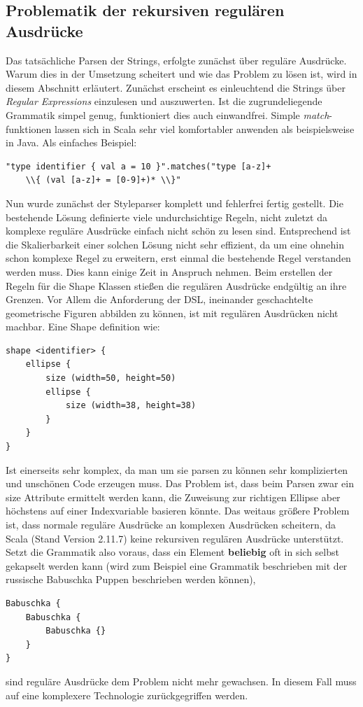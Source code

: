 \subsection{Problematik der rekursiven regulären Ausdrücke}
Das tatsächliche Parsen der Strings, erfolgte zunächst über reguläre Ausdrücke. Warum dies in der Umsetzung scheitert und wie das Problem zu lösen ist, wird in diesem Abschnitt erläutert. Zunächst erscheint es einleuchtend die Strings über \textit{Regular Expressions} einzulesen und auszuwerten. Ist die zugrundeliegende Grammatik simpel genug, funktioniert dies auch einwandfrei. Simple \textit{match}-funktionen lassen sich in Scala sehr viel komfortabler anwenden als beispielsweise in Java. Als einfaches Beispiel:
\begin{lstlisting}[style=scala]
"type identifier { val a = 10 }".matches("type [a-z]+
    \\{ (val [a-z]+ = [0-9]+)* \\}"
\end{lstlisting}Nun wurde zunächst der Styleparser komplett und fehlerfrei fertig gestellt. Die bestehende Lösung definierte viele undurchsichtige Regeln, nicht zuletzt da komplexe reguläre Ausdrücke einfach nicht schön zu lesen sind. Entsprechend ist die Skalierbarkeit einer solchen Lösung nicht sehr effizient, da um eine ohnehin schon komplexe Regel zu erweitern, erst einmal die bestehende Regel verstanden werden muss. Dies kann einige Zeit in Anspruch nehmen. Beim erstellen der Regeln für die Shape Klassen stießen die regulären Ausdrücke endgültig an ihre Grenzen. Vor Allem die Anforderung der DSL, ineinander geschachtelte geometrische Figuren abbilden zu können, ist mit regulären Ausdrücken nicht machbar. Eine Shape definition wie:
\begin{lstlisting}[style=spray]
shape <identifier> {
    ellipse {
        size (width=50, height=50)
        ellipse {
            size (width=38, height=38)
        }
    }
}
\end{lstlisting} Ist einerseits sehr komplex, da man um sie parsen zu können sehr komplizierten und unschönen Code erzeugen muss. Das Problem ist, dass beim Parsen zwar ein size Attribute ermittelt werden kann, die Zuweisung zur richtigen Ellipse aber höchstens auf einer Indexvariable basieren könnte. Das weitaus größere Problem ist,
dass normale reguläre Ausdrücke an komplexen Ausdrücken scheitern, da Scala (Stand Version 2.11.7) keine rekursiven regulären Ausdrücke unterstützt. Setzt die Grammatik also voraus, dass ein Element \textbf{beliebig} oft in sich selbst gekapselt werden kann (wird zum Beispiel eine Grammatik beschrieben mit der russische Babuschka Puppen beschrieben werden können),
\begin{lstlisting}[style=scala, aboveskip=0pt]
Babuschka {
    Babuschka {
        Babuschka {}
    }
}
\end{lstlisting}sind reguläre Ausdrücke dem Problem nicht mehr gewachsen.
In diesem Fall muss auf eine komplexere Technologie zurückgegriffen werden.
